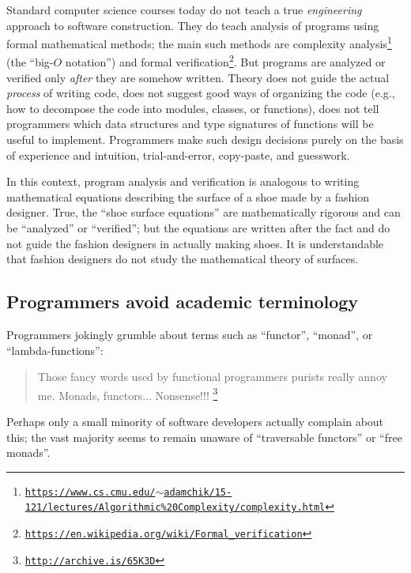 Standard computer science courses today do not teach a true \emph{engineering}
approach to software construction. They do teach analysis of programs
using formal mathematical methods; the main such methods are complexity
analysis\footnote{\texttt{\href{https://www.cs.cmu.edu/~adamchik/15-121/lectures/Algorithmic\%20Complexity/complexity.html}{https://www.cs.cmu.edu/$\sim$adamchik/15-121/lectures/Algorithmic\%20Complexity/complexity.html}}}
(the \textsf{``}big-$O$ notation\textsf{''}) and formal verification\footnote{\texttt{\href{https://en.wikipedia.org/wiki/Formal_verification}{https://en.wikipedia.org/wiki/Formal\_verification}}}.
But programs are analyzed or verified only \emph{after} they are somehow
written. Theory does not guide the actual \emph{process} of writing
code, does not suggest good ways of organizing the code (e.g., how
to decompose the code into modules, classes, or functions), does not
tell programmers which data structures and type signatures of functions
will be useful to implement. Programmers make such design decisions
purely on the basis of experience and intuition, trial-and-error,
copy-paste, and guesswork. 

In this context, program analysis and verification is analogous to
writing mathematical equations describing the surface of a shoe made
by a fashion designer. True, the \textsf{``}shoe surface equations\textsf{''} are
mathematically rigorous and can be \textsf{``}analyzed\textsf{''} or \textsf{``}verified\textsf{''};
but the equations are written after the fact and do not guide the
fashion designers in actually making shoes. It is understandable that
fashion designers do not study the mathematical theory of surfaces.

\subsection{Programmers avoid academic terminology }

Programmers jokingly grumble about terms such as \textsf{``}functor\textsf{''}, \textsf{``}monad\textsf{''},
or \textsf{``}lambda-functions\textsf{''}:
\begin{quote}
{\small{}Those fancy words used by functional programmers purists
really annoy me. Monads, functors... Nonsense!!! }\footnote{\texttt{\href{http://archive.is/65K3D}{http://archive.is/65K3D}}}
\end{quote}
Perhaps only a small minority of software developers actually complain
about this; the vast majority seems to remain unaware of \textsf{``}traversable
functors\textsf{''} or \textsf{``}free monads\textsf{''}.

